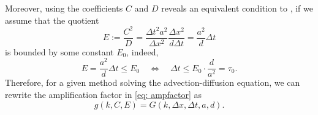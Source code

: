 Moreover, using the coefficients $C$ and $D$ reveals an equivalent condition to \cite{TanChenShu_ImEx_Stability}, if we assume that the quotient
\begin{equation*}
E:=\frac{C^2}{D}= \frac{ \Delta t ^2 a^2 }{\Delta x^2} \frac{\Delta x^2}{d \Delta t} = \frac{a^2}{d}\Delta t
\end{equation*}
is bounded by some constant $E_0$, indeed,
\begin{equation*}
E= \frac{a^2}{d}\Delta t\le E_0 \quad \Longleftrightarrow \quad \Delta t \le E_0 \cdot \frac{d}{a^2}=\tau_0.
\end{equation*}
Therefore, for a given method solving the advection-diffusion equation, we can rewrite the amplification factor  in \eqref{eq: ampfactor} as
\begin{equation}
	g(k,C,E)=G(k,\Delta x, \Delta t, a,d).
\end{equation}

